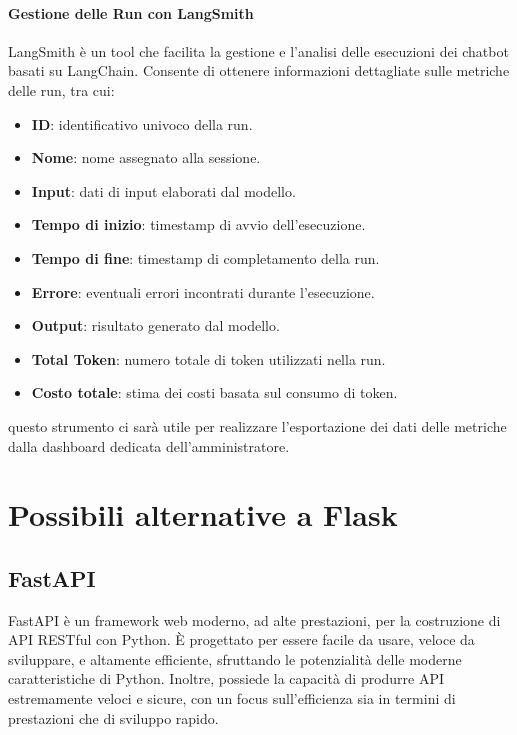 \documentclass{article}
\begin{document}
\paragraph*{Gestione delle Run con LangSmith}
LangSmith è un tool che facilita la gestione e l'analisi delle esecuzioni dei chatbot basati su LangChain. 
Consente di ottenere informazioni dettagliate sulle metriche delle run, tra cui:
\begin{itemize}
    \item \textbf{ID}: identificativo univoco della run.
    \item \textbf{Nome}: nome assegnato alla sessione.
    \item \textbf{Input}: dati di input elaborati dal modello.
    \item \textbf{Tempo di inizio}: timestamp di avvio dell'esecuzione.
    \item \textbf{Tempo di fine}: timestamp di completamento della run.
    \item \textbf{Errore}: eventuali errori incontrati durante l'esecuzione.
    \item \textbf{Output}: risultato generato dal modello.
    \item \textbf{Total Token}: numero totale di token utilizzati nella run.
    \item \textbf{Costo totale}: stima dei costi basata sul consumo di token.
\end{itemize}

questo strumento ci sarà utile per realizzare l'esportazione dei dati delle metriche dalla dashboard dedicata dell'amministratore.

\section{Possibili alternative a Flask}

\subsection{FastAPI}
FastAPI è un framework web moderno, ad alte prestazioni, per la 
costruzione di API RESTful con Python. È progettato per essere facile 
da usare, veloce da sviluppare, e altamente efficiente, sfruttando 
le potenzialità delle moderne caratteristiche di Python. Inoltre, 
possiede la capacità di produrre API estremamente veloci e sicure, 
con un focus sull'efficienza sia in termini di prestazioni che di 
sviluppo rapido.
\end{document}
